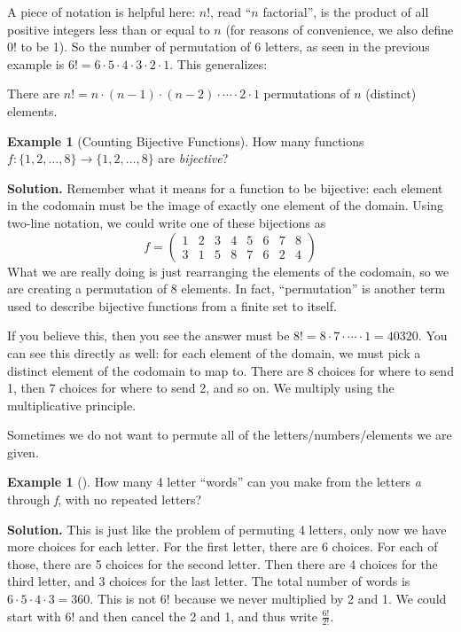\documentclass[12pt,]{book}
\theoremstyle{plain}
\theoremstyle{definition}
\theoremstyle{definition}
\newtheorem{example}[theorem]{Example}
\theoremstyle{definition}
\numberwithin{equation}{chapter}
\newcommand{\twoline}[2]{\begin{pmatrix}#1 \\ #2 \end{pmatrix}}
\newcommand{\amp}{&}
\begin{document}
\hypertarget{p-928}{}%
A piece of notation is helpful here: \(n!\), read ``\(n\) factorial'', is the product of all positive integers less than or equal to \(n\) (for reasons of convenience, we also define 0! to be 1). So the number of permutation of 6 letters, as seen in the previous example is \(6! = 6\cdot 5 \cdot 4 \cdot 3 \cdot 2 \cdot 1\). This generalizes:%
\begin{assemblage}\label{assemblage-21}
\hypertarget{p-929}{}%
There are \(n! = n\cdot (n-1)\cdot (n-2)\cdot \cdots \cdot 2\cdot 1\) permutations of \(n\) (distinct) elements.%
\end{assemblage}
\begin{example}[Counting Bijective Functions]\label{example-counting-functions-bijective}
\hypertarget{p-930}{}%
How many functions \(f:\{1,2,\ldots,8\} \to \{1,2,\ldots, 8\}\) are \emph{bijective}?%
\par\smallskip%
\noindent\textbf{Solution.}\hypertarget{solution-103}{}\quad%
\hypertarget{p-931}{}%
Remember what it means for a function to be bijective: each element in the codomain must be the image of exactly one element of the domain. Using two-line notation, we could write one of these bijections as%
\begin{equation*}
f = \twoline{1 \amp 2 \amp 3 \amp 4 \amp 5 \amp 6 \amp 7 \amp 8} {3 \amp 1 \amp 5 \amp 8 \amp 7 \amp 6 \amp 2 \amp 4}
\end{equation*}
What we are really doing is just rearranging the elements of the codomain, so we are creating a permutation of 8 elements. In fact, ``permutation'' is another term used to describe bijective functions from a finite set to itself.%
\par
\hypertarget{p-932}{}%
If you believe this, then you see the answer must be \(8! = 8 \cdot 7 \cdot\cdots\cdot 1 = 40320\). You can see this directly as well: for each element of the domain, we must pick a distinct element of the codomain to map to. There are 8 choices for where to send 1, then 7 choices for where to send 2, and so on. We multiply using the multiplicative principle.%
\end{example}
\hypertarget{p-933}{}%
Sometimes we do not want to permute all of the letters/numbers/elements we are given.%
\begin{example}[]\label{example-44}
\hypertarget{p-934}{}%
How many 4 letter ``words'' can you make from the letters \emph{a} through \emph{f}, with no repeated letters?%
\par\smallskip%
\noindent\textbf{Solution.}\hypertarget{solution-104}{}\quad%
\hypertarget{p-935}{}%
This is just like the problem of permuting 4 letters, only now we have more choices for each letter. For the first letter, there are 6 choices. For each of those, there are 5 choices for the second letter. Then there are 4 choices for the third letter, and 3 choices for the last letter. The total number of words is \(6\cdot 5\cdot 4 \cdot 3 = 360\). This is not \(6!\) because we never multiplied by 2 and 1. We could start with \(6!\) and then cancel the 2 and 1, and thus write \(\frac{6!}{2!}\).%
\end{example}
\end{document}
